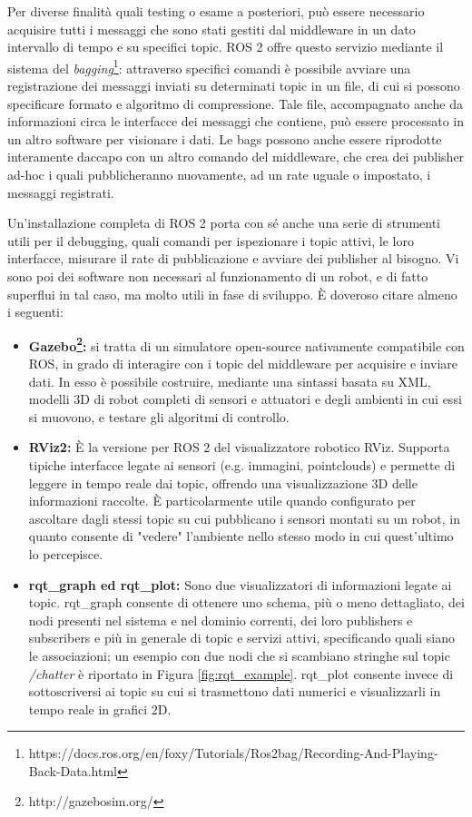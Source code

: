 \indent Per diverse finalità quali testing o esame a posteriori, può essere necessario acquisire tutti i messaggi che sono stati gestiti dal middleware in un dato intervallo di tempo e su specifici topic. ROS 2 offre questo servizio mediante il sistema del \emph{bagging}\footnote{https://docs.ros.org/en/foxy/Tutorials/Ros2bag/Recording-And-Playing-Back-Data.html}: attraverso specifici comandi è possibile avviare una registrazione dei messaggi inviati su determinati topic in un file, di cui si possono specificare formato e algoritmo di compressione. Tale file, accompagnato anche da informazioni circa le interfacce dei messaggi che contiene, può essere processato in un altro software per visionare i dati. Le bags possono anche essere riprodotte interamente daccapo con un altro comando del middleware, che crea dei publisher ad-hoc i quali pubblicheranno nuovamente, ad un rate uguale o impostato, i messaggi registrati.

\indent Un'installazione completa di ROS 2 porta con sé anche una serie di strumenti utili per il debugging, quali comandi per ispezionare i topic attivi, le loro interfacce, misurare il rate di pubblicazione e avviare dei publisher al bisogno. Vi sono poi dei software non necessari al funzionamento di un robot, e di fatto superflui in tal caso, ma molto utili in fase di sviluppo. È doveroso citare almeno i seguenti:
\vfill
\begin{itemize}
    \item \textbf{Gazebo\footnote{http://gazebosim.org/}:} si tratta di un simulatore open-source nativamente compatibile con ROS, in grado di interagire con i topic del middleware per acquisire e inviare dati. In esso è possibile costruire, mediante una sintassi basata su XML, modelli 3D di robot completi di sensori e attuatori e degli ambienti in cui essi si muovono, e testare gli algoritmi di controllo.
    \item \textbf{RViz2:} È la versione per ROS 2 del visualizzatore robotico RViz. Supporta tipiche interfacce legate ai sensori (e.g. immagini, pointclouds) e permette di leggere in tempo reale dai topic, offrendo una visualizzazione 3D delle informazioni raccolte. È particolarmente utile quando configurato per ascoltare dagli stessi topic su cui pubblicano i sensori montati su un robot, in quanto consente di "vedere" l'ambiente nello stesso modo in cui quest'ultimo lo percepisce.
    \item \textbf{rqt\_graph ed rqt\_plot:} Sono due visualizzatori di informazioni legate ai topic. rqt\_graph consente di ottenere uno schema, più o meno dettagliato, dei nodi presenti nel sistema e nel dominio correnti, dei loro publishers e subscribers e più in generale di topic e servizi attivi, specificando quali siano le associazioni; un esempio con due nodi che si scambiano stringhe sul topic \emph{/chatter} è riportato in Figura \ref{fig:rqt_example}. rqt\_plot consente invece di sottoscriversi ai topic su cui si trasmettono dati numerici e visualizzarli in tempo reale in grafici 2D.
\end{itemize}


